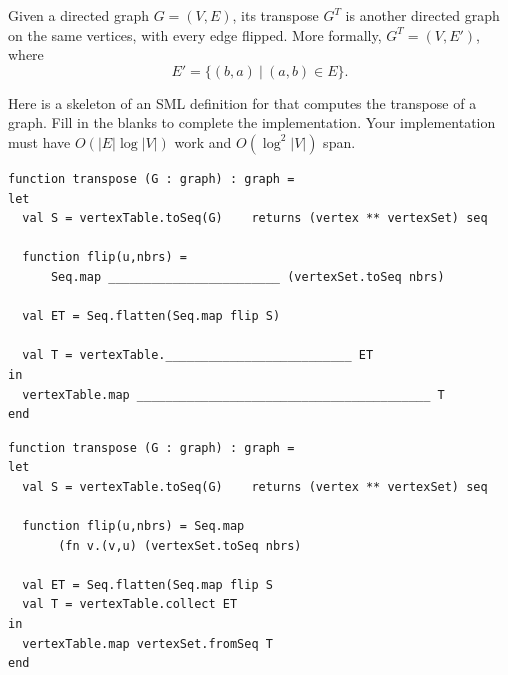 \begin{problem}[10.]
Given a directed graph $G = (V,E)$, its transpose $G^T$ is
another directed graph on the same vertices, with every edge flipped.
More formally, $G^T = (V,E')$, where
$$E' = \{(b,a)~|~(a,b) \in E \}.$$

Here is a skeleton of an SML definition for  that computes
the transpose of a graph. Fill in the blanks to complete the implementation.
Your implementation must have $O(|E| \log |V|)$ work and $O(\log^2 |V|)$
span.

\ask
\begin{lstlisting}[numbers=none]
function transpose (G : graph) : graph = 
let
  val S = vertexTable.toSeq(G)    returns (vertex ** vertexSet) seq 

  function flip(u,nbrs) = 
      Seq.map ________________________ (vertexSet.toSeq nbrs)

  val ET = Seq.flatten(Seq.map flip S)

  val T = vertexTable.__________________________ ET
in
  vertexTable.map _________________________________________ T
end
\end{lstlisting} 

\sol

\begin{lstlisting}[language=caml,numbers=none]
function transpose (G : graph) : graph = 
let
  val S = vertexTable.toSeq(G)    returns (vertex ** vertexSet) seq 

  function flip(u,nbrs) = Seq.map 
       (fn v.(v,u) (vertexSet.toSeq nbrs)

  val ET = Seq.flatten(Seq.map flip S
  val T = vertexTable.collect ET
in
  vertexTable.map vertexSet.fromSeq T
end
\end{lstlisting} 
\end{problem}


